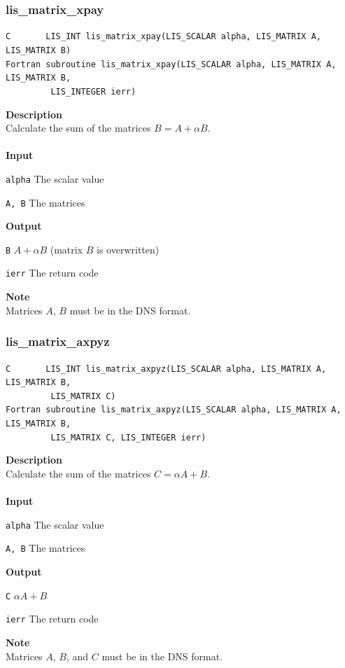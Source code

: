 \documentclass[a4paper]{article}
\newcommand{\namelistlabel}[1]{\mbox{#1}\hfill}
\newenvironment{namelist}[1]{%
\begin{list}{}
  {\let\makelabel\namelistlabel
  \settowidth{\labelwidth}{#1}
  \setlength{\leftmargin}{1.1\labelwidth}}
  }{%
\end{list}}
\begin{document}
\newpage
\subsubsection{lis\_matrix\_xpay}
\begin{screen}
\verb|C       LIS_INT lis_matrix_xpay(LIS_SCALAR alpha, LIS_MATRIX A, LIS_MATRIX B)|\\
\verb|Fortran subroutine lis_matrix_xpay(LIS_SCALAR alpha, LIS_MATRIX A, LIS_MATRIX B,|\\
\verb|         LIS_INTEGER ierr) |
\end{screen}
{\bf Description}\\
\indent
Calculate the sum of the matrices $B = A + \alpha B$.
\\ \\
\noindent
{\bf Input}
\begin{namelist}{XXXXXXXXXXXXXXXXXXXX}
\item[\tt alpha] The scalar value
\item[\tt A, B] The matrices
\end{namelist}
{\bf Output}
\begin{namelist}{XXXXXXXXXXXXXXXXXXXX}
\item[\tt B] $A + \alpha B$ (matrix $B$ is overwritten)
\item[\tt ierr] The return code
\end{namelist}
{\bf Note}\\
\indent
Matrices $A$, $B$ must be in the DNS format.

\subsubsection{lis\_matrix\_axpyz}
\begin{screen}
\verb|C       LIS_INT lis_matrix_axpyz(LIS_SCALAR alpha, LIS_MATRIX A, LIS_MATRIX B,|\\
\verb|         LIS_MATRIX C)|\\
\verb|Fortran subroutine lis_matrix_axpyz(LIS_SCALAR alpha, LIS_MATRIX A, LIS_MATRIX B,|\\
\verb|         LIS_MATRIX C, LIS_INTEGER ierr) |
\end{screen}
{\bf Description}\\
\indent
Calculate the sum of the matrices $C = \alpha A + B$.
\\ \\
\noindent
{\bf Input}
\begin{namelist}{XXXXXXXXXXXXXXXXXXXX}
\item[\tt alpha] The scalar value
\item[\tt A, B] The matrices
\end{namelist}
{\bf Output}
\begin{namelist}{XXXXXXXXXXXXXXXXXXXX}
\item[\tt C] $\alpha A + B$
\item[\tt ierr] The return code
\end{namelist}
{\bf Note}\\
\indent
Matrices $A$, $B$, and $C$ must be in the DNS format.
\end{document}
